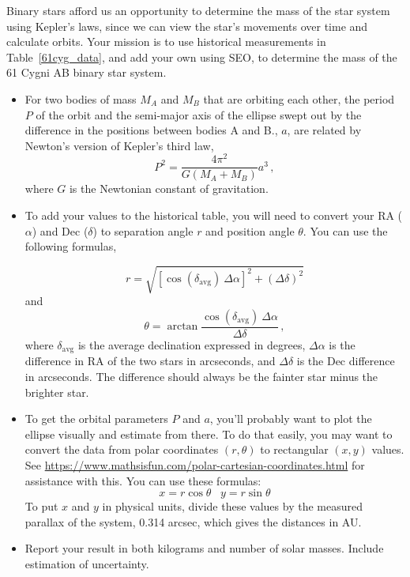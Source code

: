 Binary stars afford us an opportunity to determine the mass of the star system using Kepler's laws, since we can view the star's movements over time and calculate orbits. Your mission is to use historical measurements in Table\ \ref{61cyg_data}, and add your own using SEO, to determine the mass of the 61 Cygni AB binary star system.

\begin{itemize}
	\item For two bodies of mass $M_A$ and $M_B$ that are orbiting each other, the period $P$ of the orbit and the semi-major axis of the ellipse swept out by the difference in the positions between bodies A and B., $a$, are related by Newton's version of Kepler's third law,
	\begin{equation}
	P^2 = \frac{4\pi^2}{G(M_A + M_B)}a^3 \,,
	\end{equation}
	where $G$ is the Newtonian constant of gravitation.

	\item To add your values to the historical table, you will need to convert your RA ($\alpha$) and Dec ($\delta$) to separation angle $r$ and position angle $\theta$. You can use the following formulas,
	
	\begin{equation}
	r = \sqrt{[\cos(\delta_{\textrm{avg}}) \: \Delta\alpha]^2 + (\Delta\delta)^2}
	\end{equation}
	and
	\begin{equation}
	\theta = \arctan{\frac{\cos(\delta_{\textrm{avg}})\:\Delta\alpha}{\Delta\delta}}\,,
	\end{equation}
	where $\delta_{\textrm{avg}}$ is the average declination expressed in degrees, $\Delta\alpha$ is the difference in RA of the two stars in arcseconds, and $\Delta\delta$ is the Dec difference in arcseconds. The difference should always be the fainter star minus the brighter star.
	
	\item To get the orbital parameters $P$ and $a$, you'll probably want to plot the ellipse visually and estimate from there. To do that easily, you may want to convert the data from polar coordinates $(r,\theta)$ to rectangular $(x,y)$ values. See \url{https://www.mathsisfun.com/polar-cartesian-coordinates.html} for assistance with this. You can use these formulas:
	\begin{equation}
	x = r\cos\theta\;\;\;y = r\sin\theta
	\end{equation}
	To put $x$ and $y$ in physical units, divide these values by the measured parallax of the system, 0.314 arcsec, which gives the distances in AU.
	
	\item Report your result in both kilograms and number of solar masses. Include estimation of uncertainty.
\end{itemize}

